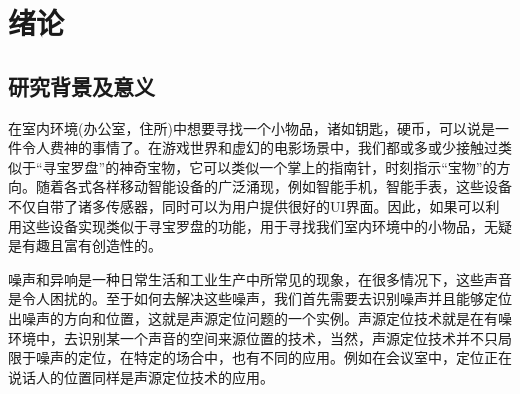 \documentclass[winfonts]{njuthesis}
\begin{document}
%
%
%
%

\tableofcontents



\mainmatter

\chapter{绪论}\label{chapter_introduction}
	\section{研究背景及意义}
	
		在室内环境(办公室，住所)中想要寻找一个小物品，诸如钥匙，硬币，可以说是一件令人费神的事情了\cite{HyperEarAbstract}。在游戏世界和虚幻的电影场景中，我们都或多或少接触过类似于“寻宝罗盘”的神奇宝物，它可以类似一个掌上的指南针，时刻指示“宝物”的方向。随着各式各样移动智能设备的广泛涌现，例如智能手机，智能手表，这些设备不仅自带了诸多传感器，同时可以为用户提供很好的UI界面。因此，如果可以利用这些设备实现类似于寻宝罗盘的功能，用于寻找我们室内环境中的小物品，无疑是有趣且富有创造性的。
		
		噪声和异响是一种日常生活和工业生产中所常见的现象，在很多情况下，这些声音是令人困扰的。至于如何去解决这些噪声，我们首先需要去识别噪声并且能够定位出噪声的方向和位置，这就是声源定位问题的一个实例。声源定位技术就是在有噪环境中，去识别某一个声音的空间来源位置的技术，当然，声源定位技术并不只局限于噪声的定位，在特定的场合中，也有不同的应用。例如在会议室中，定位正在说话人的位置同样是声源定位技术的应用。
		
\end{document}
